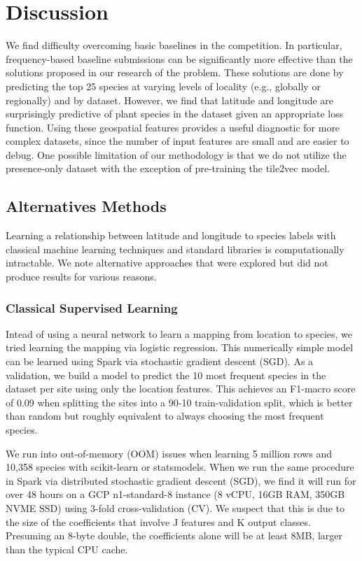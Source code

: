 \section{Discussion}

We find difficulty overcoming basic baselines in the competition.
In particular, frequency-based baseline submissions can be significantly more effective than the solutions proposed in our research of the problem.
These solutions are done by predicting the top 25 species at varying levels of locality (e.g., globally or regionally) and by dataset.
However, we find that latitude and longitude are surprisingly predictive of plant species in the dataset given an appropriate loss function.
Using these geospatial features provides a useful diagnostic for more complex datasets, since the number of input features are small and are easier to debug.
One possible limitation of our methodology is that we do not utilize the presence-only dataset with the exception of pre-training the tile2vec model.

\subsection{Alternatives Methods}

Learning a relationship between latitude and longitude to species labels with classical machine learning techniques and standard libraries is computationally intractable.
We note alternative approaches that were explored but did not produce results for various reasons.

\subsubsection{Classical Supervised Learning}

Intead of using a neural network to learn a mapping from location to species, we tried learning the mapping via logistic regression.
This numerically simple model can be learned using Spark via stochastic gradient descent (SGD). 
As a validation, we build a model to predict the 10 most frequent species in the dataset per site using only the location features. 
This achieves an F1-macro score of 0.09 when splitting the sites into a 90-10 train-validation split, which is better than random but roughly equivalent to always choosing the most frequent species.

We run into out-of-memory (OOM) issues when learning 5 million rows and 10,358 species with scikit-learn or statsmodels.
When we run the same procedure in Spark via distributed stochastic gradient descent (SGD), we find it will run for over 48 hours on a GCP n1-standard-8 instance (8 vCPU, 16GB RAM, 350GB NVME SSD) using 3-fold cross-validation (CV). 
We suspect that this is due to the size of the coefficients that involve J features and K output classes. 
Presuming an 8-byte double, the coefficients alone will be at least 8MB, larger than the typical CPU cache. 

